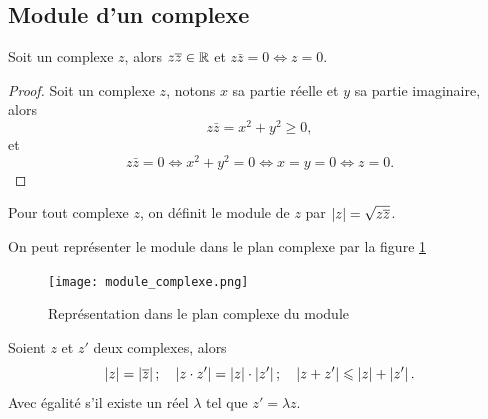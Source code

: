 \subsection{Module d'un complexe}
\label{subsec:modulecomplexe}
\begin{prop}
    Soit un complexe \(z\), alors \(z \overline{z} \in \mathbb{R}\) et \(z \bar{z}=0 \iff z = 
    0\).
\end{prop}
\begin{proof}
    Soit un complexe \(z\), notons \(x\) sa partie réelle et \(y\) sa partie 
    imaginaire, alors
    \begin{equation}
        z \bar{z}=x^2+y^2 \geqslant 0,
    \end{equation}
    et
    \begin{equation}
        z \bar{z}=0 \iff x^2+y^2=0 \iff x=y=0 \iff z=0.
    \end{equation}
\end{proof}
\begin{defdef}
    Pour tout complexe \(z\), on définit le module de \(z\) par 
    \(\left\lvert z\right\rvert=\sqrt{z \overline{z}}\).
\end{defdef}
On peut représenter le module dans le plan complexe par la figure 
\ref{fig:moduleComplexe}
\begin{figure}
    \centering
    \texttt{[image: module\_complexe.png]}
    \caption{Représentation dans le plan complexe du module}
    \label{fig:moduleComplexe}
\end{figure}
\begin{prop}
    Soient \(z\) et \(z'\) deux complexes, alors
    \begin{equation}
        \left\lvert z\right\rvert=\left\lvert\overline{z}\right\rvert; \quad \left\lvert z \cdot z'\right\rvert=\left\lvert z\right\rvert \cdot \left\lvert z'\right\rvert; 
        \quad \left\lvert z+z'\right\rvert\leqslant\left\lvert z\right\rvert+\left\lvert z'\right\rvert.
    \end{equation}
    Avec égalité s'il existe un réel \(\lambda\) tel que \(z'=\lambda z\).
\end{prop}
